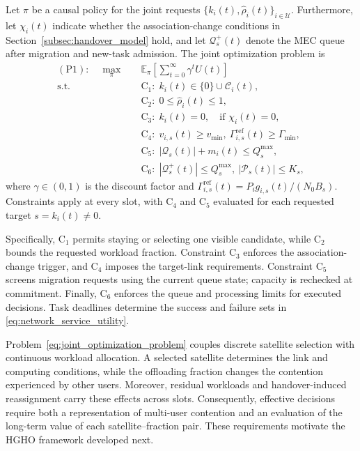 \documentclass[journal]{IEEEtran}
\begin{document}
Let $\pi$ be a causal policy for the joint requests
$\{k_i(t),\widehat{\rho}_i(t)\}_{i\in\mathcal{U}}$.
Furthermore, let $\chi_i(t)$ indicate whether the
association-change conditions in
Section~\ref{subsec:handover_model} hold, and let
$\mathcal{Q}_s^{+}(t)$ denote the MEC queue after migration
and new-task admission.
The joint optimization problem is
\begin{equation}
\begin{aligned}
\mathrm{(P1)}:\quad
\max_{\pi}\quad&
\mathbb{E}_{\pi}
\left[\sum_{t=0}^{\infty}\gamma^t U(t)\right]\\
\mathrm{s.t.}\quad
&\mathrm{C}_1:\;
k_i(t)\in\{0\}\cup\mathcal{C}_i(t),\\
&\mathrm{C}_2:\;
0\leq\widehat{\rho}_i(t)\leq1,\\
&\mathrm{C}_3:\;
k_i(t)=0,\quad\text{if }\chi_i(t)=0,\\
&\mathrm{C}_4:\;
v_{i,s}(t)\geq v_{\min},\
\Gamma^{\mathrm{ref}}_{i,s}(t)\geq\Gamma_{\min},\\
&\mathrm{C}_5:\;
|\mathcal{Q}_s(t)|+m_i(t)\leq Q_s^{\max},\\
&\mathrm{C}_6:\;
|\mathcal{Q}_s^{+}(t)|\leq Q_s^{\max},\
|\mathcal{P}_s(t)|\leq K_s,
\end{aligned}
\label{eq:joint_optimization_problem}
\end{equation}
where $\gamma\in(0,1)$ is the discount factor and
$\Gamma^{\mathrm{ref}}_{i,s}(t)
=P_i g_{i,s}(t)/(N_0B_s)$.
Constraints apply at every slot, with
$\mathrm{C}_4$ and $\mathrm{C}_5$ evaluated for each
requested target $s=k_i(t)\neq0$.

Specifically, $\mathrm{C}_1$ permits staying or selecting
one visible candidate, while $\mathrm{C}_2$ bounds the
requested workload fraction.
Constraint $\mathrm{C}_3$ enforces the association-change
trigger, and $\mathrm{C}_4$ imposes the target-link
requirements.
Constraint $\mathrm{C}_5$ screens migration requests
using the current queue state; capacity is rechecked
at commitment.
Finally, $\mathrm{C}_6$ enforces the queue and processing
limits for executed decisions.
Task deadlines determine the success and failure sets
in \eqref{eq:network_service_utility}.

Problem~\eqref{eq:joint_optimization_problem} couples
discrete satellite selection with continuous workload
allocation. A selected satellite determines the link
and computing conditions, while the offloading fraction
changes the contention experienced by other users.
Moreover, residual workloads and handover-induced
reassignment carry these effects across slots.
Consequently, effective decisions require both a
representation of multi-user contention and an
evaluation of the long-term value of each
satellite--fraction pair. These requirements motivate
the HGHO framework developed next.
\end{document}

